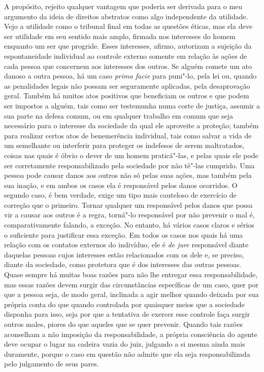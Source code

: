 A propósito, rejeito qualquer vantagem que poderia ser
derivada para o meu argumento da ideia de direitos abstratos como algo
independente da utilidade. Vejo a utilidade como o tribunal final em
todas as questões éticas, mas ela deve ser utilidade em seu sentido
mais amplo, firmada nos interesses do homem enquanto um ser que
progride. Esses interesses, afirmo, autorizam a sujeição da
espontaneidade individual ao controle externo somente em relação às
ações de cada pessoa que concernem aos interesses dos outros. Se alguém
comete um ato danoso a outra pessoa, há um caso \textit{prima facie}
para puni"-lo, pela lei ou, quando as penalidades legais não possam ser
seguramente aplicadas, pela desaprovação geral. Também há muitos atos
positivos que beneficiam os outros e que podem ser impostos a alguém,
tais como ser testemunha numa corte de justiça, assumir a sua 
parte na defesa comum, ou em qualquer trabalho em comum que seja
necessário para o interesse da sociedade da qual ele aproveite a
proteção; também para realizar certos atos de
benemerência individual, tais como salvar a vida de um semelhante ou
interferir para proteger os indefesos de serem maltratados, coisas nas
quais é óbvio o dever de um homem praticá"-las, e pelas quais ele
pode ser corretamente responsabilizado pela sociedade por não tê"-las
cumprido. Uma pessoa pode causar danos aos outros não só pelas suas
ações, mas também pela sua inação, e em ambos os casos ela
é responsável pelos danos ocorridos. O segundo caso, é bem verdade,
exige um tipo mais cauteloso de exercício de correção que o primeiro.
Tornar qualquer um responsável pelos danos que possa vir a causar aos
outros é a regra, torná"-lo responsável por não prevenir o mal é,
comparativamente falando, a exceção. No entanto, há vários casos claros
e sérios o suficiente para justificar essa exceção. Em todos os casos
nos quais há uma relação com os contatos externos do indivíduo, ele é
\textit{de jure} responsável diante daquelas pessoas cujos interesses
estão relacionados com os dele e, se preciso, diante da sociedade,
como protetora que é dos interesses das outras pessoas. Quase
sempre há muitas boas razões para não lhe entregar essa
responsabilidade, mas essas razões devem surgir das circunstâncias
específicas de um caso, quer por que a pessoa seja, de modo geral,
inclinada a agir melhor quando deixada por sua própria conta do que
quando controlada por quaisquer meios que a sociedade disponha
para isso, seja por que a tentativa de exercer esse
controle faça surgir outros males, piores do que aqueles que se quer
prevenir. Quando tais razões aconselham a não imposição da
responsabilidade, a própria consciência do agente deve ocupar o lugar
na cadeira vazia do juiz, julgando a si mesma ainda mais duramente,
porque o caso em questão não admite que ela seja 
responsabilizada pelo julgamento de seus pares.

